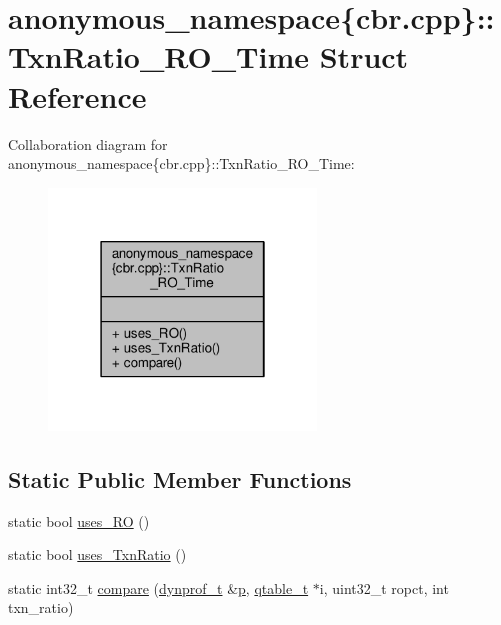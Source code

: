 \hypertarget{structanonymous__namespace_02cbr_8cpp_03_1_1TxnRatio__RO__Time}{\section{anonymous\-\_\-namespace\{cbr.\-cpp\}\-:\-:Txn\-Ratio\-\_\-\-R\-O\-\_\-\-Time Struct Reference}
\label{structanonymous__namespace_02cbr_8cpp_03_1_1TxnRatio__RO__Time}
}


Collaboration diagram for anonymous\-\_\-namespace\{cbr.\-cpp\}\-:\-:Txn\-Ratio\-\_\-\-R\-O\-\_\-\-Time\-:
\nopagebreak
\begin{figure}[H]
\begin{center}
\leavevmode
\includegraphics[width=202pt]{structanonymous__namespace_02cbr_8cpp_03_1_1TxnRatio__RO__Time__coll__graph}
\end{center}
\end{figure}
\subsection*{Static Public Member Functions}
\begin{DoxyCompactItemize}
\item 
static bool \hyperlink{structanonymous__namespace_02cbr_8cpp_03_1_1TxnRatio__RO__Time_a82aaed953a0afb6382bbfd1ac9cd5995}{uses\-\_\-\-R\-O} ()
\item 
static bool \hyperlink{structanonymous__namespace_02cbr_8cpp_03_1_1TxnRatio__RO__Time_a2ffa57ad80216dcaacea2960b3a844d6}{uses\-\_\-\-Txn\-Ratio} ()
\item 
static int32\-\_\-t \hyperlink{structanonymous__namespace_02cbr_8cpp_03_1_1TxnRatio__RO__Time_a50df356229f97c99f3060b530926106f}{compare} (\hyperlink{structstm_1_1dynprof__t}{dynprof\-\_\-t} \&\hyperlink{counted__ptr_8hpp_a5c9f59d7c24e3fd6ceae319a968fc3e0}{p}, \hyperlink{structstm_1_1qtable__t}{qtable\-\_\-t} $\ast$i, uint32\-\_\-t ropct, int txn\-\_\-ratio)
\end{DoxyCompactItemize}


